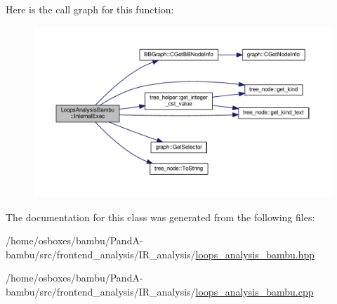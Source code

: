 Here is the call graph for this function\+:
\nopagebreak
\begin{figure}[H]
\begin{center}
\leavevmode
\includegraphics[width=350pt]{d5/d6d/classLoopsAnalysisBambu_a74777cea2f8fe8405e32a348d585a3d1_cgraph}
\end{center}
\end{figure}


The documentation for this class was generated from the following files\+:\begin{DoxyCompactItemize}
\item 
/home/osboxes/bambu/\+Pand\+A-\/bambu/src/frontend\+\_\+analysis/\+I\+R\+\_\+analysis/\hyperlink{loops__analysis__bambu_8hpp}{loops\+\_\+analysis\+\_\+bambu.\+hpp}\item 
/home/osboxes/bambu/\+Pand\+A-\/bambu/src/frontend\+\_\+analysis/\+I\+R\+\_\+analysis/\hyperlink{loops__analysis__bambu_8cpp}{loops\+\_\+analysis\+\_\+bambu.\+cpp}\end{DoxyCompactItemize}
